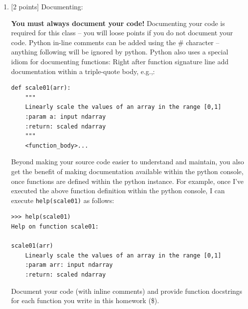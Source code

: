 \documentclass[10pt]{article}
\begin{document}
\begin{enumerate}
\begin{verbatim}
    print(plt.cm.cmapname)

    plt.imshow(dat, cmap='gray')
    plt.show()

    for _ in range(0, 2):
        ran = np.random.random(dat.shape)
        plt.imshow(ran)
        plt.show()
        np.savetxt(outfile, ran)

    ran1 = np.loadtxt(outfile)
    plt.imshow(ran1)
    plt.show()

    print('Done.')

if __name__ == '__main__':
    main()

$ ./hw1.py
type = <class 'numpy.ndarray'>
size = 210816
shape = (366, 576)
max = 0.9450980392156862
min = 0.0
scaled min = 0.0 max = 1.0 shape = (366, 576)
tab20c_r
Done.

\end{verbatim}


\item \label{prob:8} [2 points]
Documenting:

{\bf You must always document your code!}  Documenting your code is {\color{red} required} for this class -- you will loose points if you do not document your code.  Python in-line comments can be added using the \# character -- anything following will be ignored by python.  Python also uses a special idiom for documenting functions: Right after function signature line add documentation within a triple-quote body, e.g.,:
\begin{verbatim}
def scale01(arr):
    """
    Linearly scale the values of an array in the range [0,1]
    :param a: input ndarray
    :return: scaled ndarray
    """
    <function_body>...
\end{verbatim}
Beyond making your source code easier to understand and maintain, you also get the benefit of making documentation available within the python console, once functions are defined within the python instance.  For example, once I've executed the above function definition within the python console, I can execute {\tt help(scale01)} as follows:
\begin{verbatim}
>>> help(scale01)
Help on function scale01:

scale01(arr)
    Linearly scale the values of an array in the range [0,1]
    :param arr: input ndarray
    :return: scaled ndarray
\end{verbatim}

Document your code (with inline comments) and provide function docstrings for each function you write in this homework (\$).


\end{enumerate}
\end{document}
